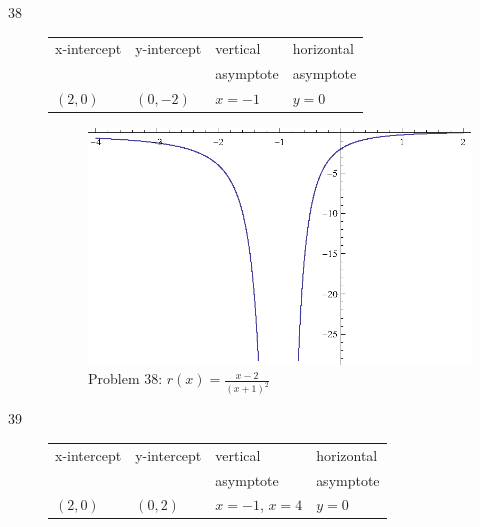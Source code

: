 \documentclass{exam}
\begin{document}
\begin{description}
    \item[38]
      \begin{tabular}{llll}
        \toprule
        x-intercept  & y-intercept & vertical  & horizontal \\
                     &             & asymptote & asymptote \\
        \midrule
        $(2, 0)$     & $(0, -2)$   & $x = -1$  & $y = 0$ \\
        \bottomrule
      \end{tabular}

      \begin{figure}[H]
        \centering
        \includegraphics[scale = 0.8]{problem38.eps}
        \caption*{ Problem 38: $r(x) = \frac{x - 2}{(x + 1)^2}$ }
      \end{figure}

    \item[39]
      \begin{tabular}{llll}
        \toprule
        x-intercept   & y-intercept & vertical          & horizontal \\
                      &             & asymptote         & asymptote \\
        \midrule
        $(2, 0)$      & $(0, 2)$    & $x = -1$, $x = 4$ & $y = 0$ \\
        \bottomrule
      \end{tabular}


\end{description}
\end{document}
